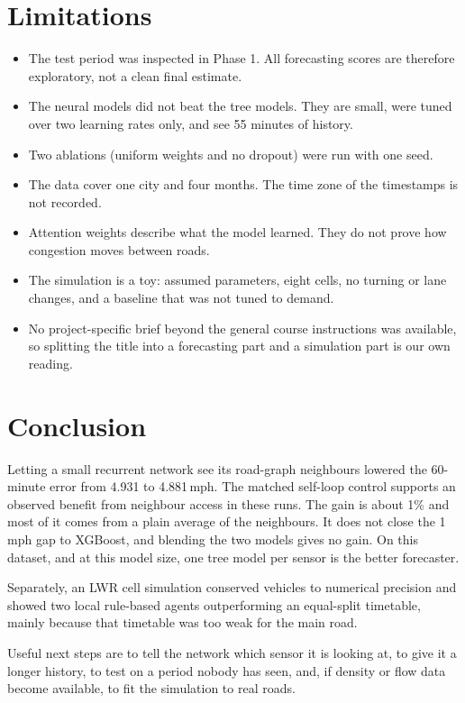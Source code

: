 \documentclass[conference]{IEEEtran}
\begin{document}
\section{Limitations}
\begin{itemize}
\item The test period was inspected in Phase 1. All forecasting scores are therefore exploratory, not a clean final estimate.
\item The neural models did not beat the tree models. They are small, were tuned over two learning rates only, and see 55 minutes of history.
\item Two ablations (uniform weights and no dropout) were run with one seed.
\item The data cover one city and four months. The time zone of the timestamps is not recorded.
\item Attention weights describe what the model learned. They do not prove how congestion moves between roads.
\item The simulation is a toy: assumed parameters, eight cells, no turning or lane changes, and a baseline that was not tuned to demand.
\item No project-specific brief beyond the general course instructions was available, so splitting the title into a forecasting part and a simulation part is our own reading.
\end{itemize}

\section{Conclusion}
Letting a small recurrent network see its road-graph neighbours lowered the 60-minute error from 4.931 to 4.881\,mph. The matched self-loop control supports an observed benefit from neighbour access in these runs. The gain is about 1\% and most of it comes from a plain average of the neighbours. It does not close the 1\,mph gap to XGBoost, and blending the two models gives no gain. On this dataset, and at this model size, one tree model per sensor is the better forecaster.

Separately, an LWR cell simulation conserved vehicles to numerical precision and showed two local rule-based agents outperforming an equal-split timetable, mainly because that timetable was too weak for the main road.

Useful next steps are to tell the network which sensor it is looking at, to give it a longer history, to test on a period nobody has seen, and, if density or flow data become available, to fit the simulation to real roads.
\end{document}
